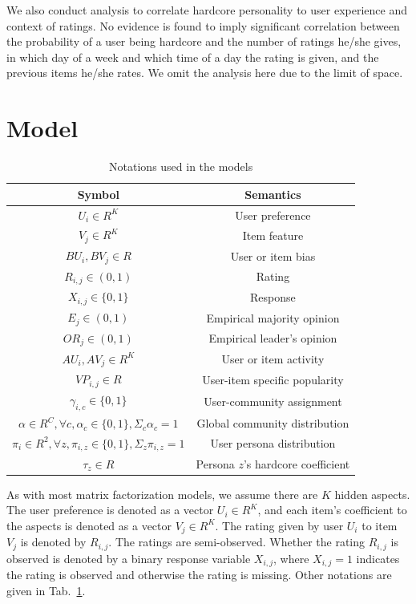 \documentclass[sigconf]{acmart}
\begin{document}
We also conduct analysis to correlate hardcore personality to user experience and context of ratings. No evidence is found to imply significant correlation between the probability of a user being hardcore and the number of ratings he/she gives, in which day of a week and which time of a day the rating is given, and the previous items he/she rates. We omit the analysis here due to the limit of space.

\section{Model}\label{sec:model}

\begin{table}[htp]
\caption{Notations used in the models}
\begin{center}
\small
\begin{tabular}{|c|c|}
\hline 
Symbol & Semantics \\\hline
\hline
$U_i\in R^K$ & User preference \\\hline
$V_j \in R^K$ & Item feature \\\hline
$BU_i,BV_j\in R$ & User or item bias \\\hline
$R_{i,j}\in (0,1)$ & Rating \\\hline
$X_{i,j} \in \{0,1\}$ & Response \\\hline
$E_j\in (0,1)$ & Empirical majority opinion \\\hline
$OR_j\in (0,1)$ & Empirical leader's opinion \\\hline
$AU_i,AV_j\in R^K$ & User or item activity \\\hline
$VP_{i,j}\in R$ & User-item specific popularity \\\hline
$\gamma_{i,c}\in \{0,1\}$ & User-community assignment\\\hline
$\alpha\in R^C, \forall c, \alpha_{c}\in \{0,1\}, \Sigma_c\alpha_c=1$ & Global community distribution\\\hline
$\pi_i\in R^2, \forall z, \pi_{i,z}\in \{0,1\}, \Sigma_z \pi_{i,z}=1$ & User persona distribution\\\hline
$\tau_z\in R$ & Persona $z$'s hardcore coefficient \\\hline
\end{tabular}
\end{center}
\label{tab:notations}
\end{table}%



As with most matrix factorization models, we assume there are $K$ hidden aspects. The user preference is denoted as a vector $U_i\in R^K$, and each item's coefficient to the aspects is denoted as a vector $V_j \in R^K$. The rating given by user $U_i$ to item $V_j$ is denoted by $R_{i,j}$. The ratings are semi-observed. Whether the rating $R_{i,j}$ is observed is denoted by a binary response variable $X_{i,j}$, where $X_{i,j}=1$ indicates the rating is observed and otherwise the rating is missing. Other notations are given in Tab.~\ref{tab:notations}. 
\end{document}
